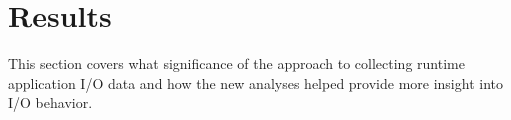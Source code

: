 \section{Results}
This section covers what significance of the approach to collecting runtime application I/O data and how the new analyses helped provide more insight into I/O behavior. 
